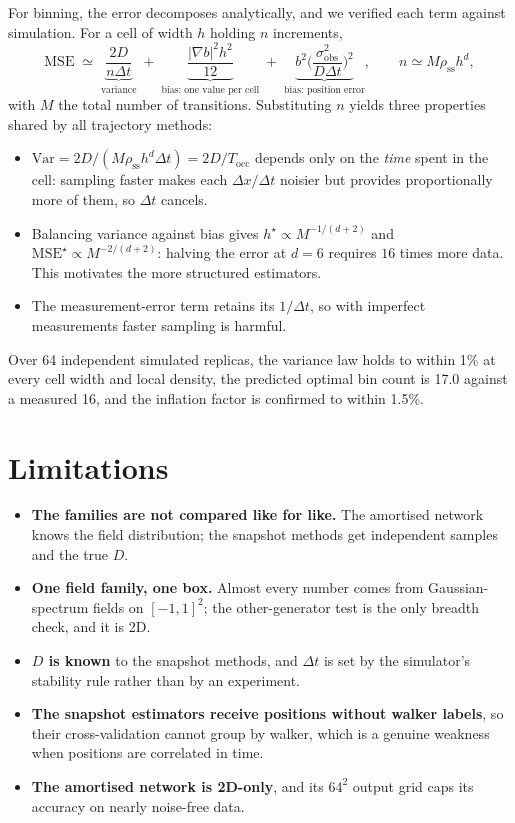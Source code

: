 \documentclass[11pt,a4paper]{article}
\newcommand{\dt}{\Delta t}
\newcommand{\dx}{\Delta x}
\newcommand{\rss}{\rho_{\mathrm{ss}}}
\begin{document}
For binning, the error decomposes analytically, and we verified each term against
simulation. For a cell of width $h$ holding $n$ increments,
\begin{equation}
  \mathrm{MSE} \;\simeq\; \underbrace{\frac{2D}{n\dt}}_{\text{variance}}
  \;+\;\underbrace{\frac{|\nabla b|^2h^2}{12}}_{\text{bias: one value per cell}}
  \;+\;\underbrace{b^2\Big(\frac{\sigma_{\mathrm{obs}}^2}{D\dt}\Big)^{\!2}}_{\text{bias: position error}},
  \qquad n \simeq M\rss h^d ,
\end{equation}
with $M$ the total number of transitions. Substituting $n$ yields three properties shared by
all trajectory methods:
\begin{itemize}[leftmargin=1.2em,itemsep=0.1em]
\item $\mathrm{Var}=2D/(M\rss h^d\dt)=2D/T_{\mathrm{occ}}$ depends only on the \emph{time}
      spent in the cell: sampling faster makes each $\dx/\dt$ noisier but provides
      proportionally more of them, so $\dt$ cancels.
\item Balancing variance against bias gives $h^\star\propto M^{-1/(d+2)}$ and
      $\mathrm{MSE}^\star\propto M^{-2/(d+2)}$: halving the error at $d=6$ requires $16$ times
      more data. This motivates the more structured estimators.
\item The measurement-error term retains its $1/\dt$, so with imperfect measurements faster
      sampling is harmful.
\end{itemize}
Over 64 independent simulated replicas, the variance law holds to within
1\% at every cell width and local density, the predicted optimal bin count is 17.0
against a measured 16, and the inflation factor is confirmed to within 1.5\%.

\section{Limitations}

\begin{itemize}[leftmargin=1.2em,itemsep=0.12em]
\item \textbf{The families are not compared like for like.} The amortised network knows the
      field distribution; the snapshot methods get independent samples and the true $D$.
\item \textbf{One field family, one box.} Almost every number comes from Gaussian-spectrum
      fields on $[-1,1]^2$; the other-generator test is the only breadth check, and it is 2D.
\item \textbf{$D$ is known} to the snapshot methods, and $\dt$ is set by the simulator's
      stability rule rather than by an experiment.
\item \textbf{The snapshot estimators receive positions without walker labels}, so their
      cross-validation cannot group by walker, which is a genuine weakness when positions are
      correlated in time.
\item \textbf{The amortised network is 2D-only}, and its $64^2$ output grid caps its accuracy
      on nearly noise-free data.
\end{itemize}
\end{document}
